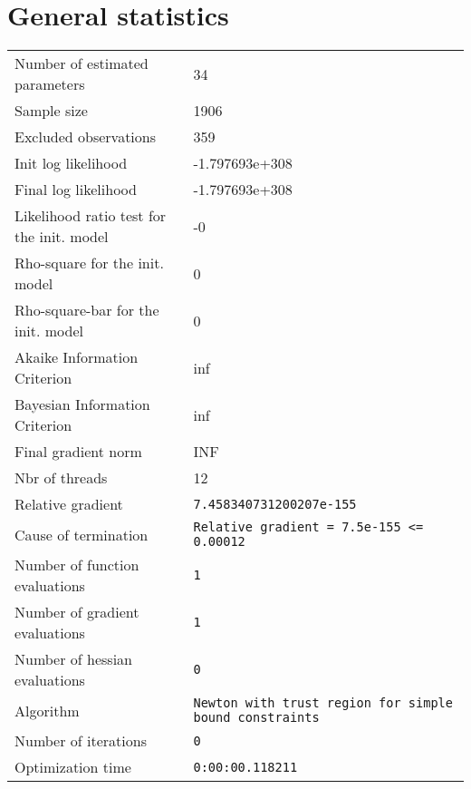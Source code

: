 



\section{General statistics}
\begin{tabular}{ll}
Number of estimated parameters & 34 \\
Sample size & 1906 \\
Excluded observations & 359 \\
Init log likelihood & -1.797693e+308 \\
Final log likelihood & -1.797693e+308 \\
Likelihood ratio test for the init. model & -0 \\
Rho-square for the init. model & 0 \\
Rho-square-bar for the init. model & 0 \\
Akaike Information Criterion & inf \\
Bayesian Information Criterion & inf \\
Final gradient norm & INF \\
Nbr of threads & 12 \\
Relative gradient & \verb$7.458340731200207e-155$ \\
Cause of termination & \verb$Relative gradient = 7.5e-155 <= 0.00012$ \\
Number of function evaluations & \verb$1$ \\
Number of gradient evaluations & \verb$1$ \\
Number of hessian evaluations & \verb$0$ \\
Algorithm & \verb$Newton with trust region for simple bound constraints$ \\
Number of iterations & \verb$0$ \\
Optimization time & \verb$0:00:00.118211$ \\
\end{tabular}

